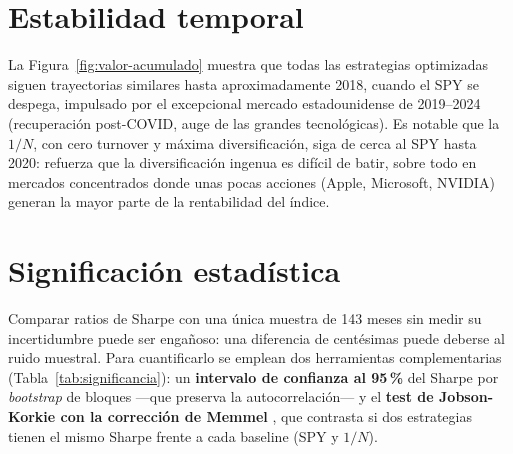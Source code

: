 \section{Estabilidad temporal}

La Figura~\ref{fig:valor-acumulado} muestra que todas las estrategias
optimizadas siguen trayectorias similares hasta aproximadamente 2018, cuando el
SPY se despega,
impulsado por el excepcional mercado estadounidense de 2019--2024 (recuperación
post-COVID, auge de las grandes tecnológicas). Es notable que la $1/N$, con cero
turnover y máxima diversificación, siga de cerca al SPY hasta 2020: refuerza que
la diversificación ingenua es difícil de batir, sobre todo en mercados
concentrados donde unas pocas acciones (Apple, Microsoft, NVIDIA) generan la
mayor parte de la rentabilidad del índice.

\section{Significación estadística}
\label{sec:significancia}

Comparar ratios de Sharpe con una única muestra de 143 meses sin medir su
incertidumbre puede ser engañoso: una diferencia de centésimas puede deberse al
ruido muestral. Para cuantificarlo se emplean dos herramientas complementarias
(Tabla~\ref{tab:significancia}): un \textbf{intervalo de confianza al 95\,\%} del
Sharpe por \textit{bootstrap} de bloques ---que preserva la autocorrelación--- y
el \textbf{test de Jobson-Korkie con la corrección de Memmel} \cite{Memmel2003},
que contrasta si dos estrategias tienen el mismo Sharpe frente a cada baseline
(SPY y $1/N$).

\begin{table}[htbp]
    \centering
    \caption{Significación estadística de los ratios de Sharpe: intervalo de
             confianza al 95\,\% por \textit{bootstrap} y $p$-valor del test de
             Memmel frente a cada baseline. El Sharpe de esta tabla se calcula
             como media/desviación típica mensual anualizada, ligeramente
             superior al de la Tabla~\ref{tab:resultados-globales} (geométrico)
             por el efecto del \textit{volatility drag}.}
    \label{tab:significancia}
    \small
    
\end{table}

